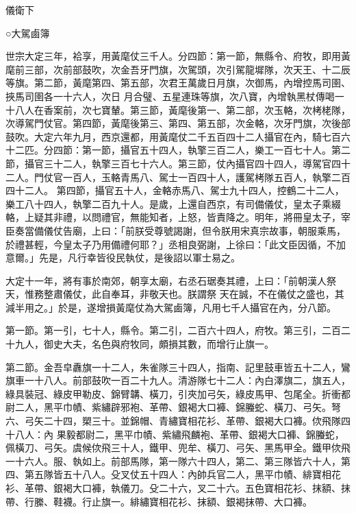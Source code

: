 
\begin{pinyinscope}

 儀衛下



 ○大駕鹵簿



 世宗大定三年，袷享，用黃麾仗三千人。分四節：第一節，無縣令、府牧，即用黃麾前三部，次前部鼓吹，次金吾牙門旗，次駕頭，次引駕龍墀隊，次天王、十二辰等旗。第二節，黃麾第四、第五部，次君王萬歲日月旗，次御馬，內增控馬司圉、挾馬司圉各一十六人，次日
 月合璧、五星連珠等旗，次八寶，內增執黑杖傳喝一十八人在香案前，次七寶輦。第三節，黃麾後第一、第二部，次玉輅，次栲栳隊，次導駕門仗官。第四節，黃麾後第三、第四、第五部，次金輅，次牙門旗，次後部鼓吹。大定六年九月，西京還都，用黃麾仗二千五百四十二人攝官在內，騎七百六十二匹。分四節：第一節，攝官五十四人，執擎三百二人，樂工一百七十人。第二節，攝官三十二人，執擎三百七十六人。第三節，仗內攝官四十四人，導駕官四十二人。門仗官一百人，玉輅青馬八、駕士一百四十人，護駕栲隊五百人，執擎二百四十二人。
 第四節，攝官五十人，金輅赤馬八、駕士九十四人，控鶴二十二人，樂工八十四人，執擎二百九十人。是歲，上還自西京，有司備儀仗，皇太子乘綴輅，上疑其非禮，以問禮官，無能知者，上怒，皆責降之。明年，將冊皇太子，宰臣奏當備儀仗告廟，上曰：「前朕受尊號謁謝，但令朕用宋真宗故事，朝服乘馬，於禮甚輕，今皇太子乃用備禮何耶？」丞相良弼謝，上徐曰：「此文臣因循，不加意爾。」先是，凡行幸皆役民執仗，是後詔以軍士易之。



 大定十一年，將有事於南郊，朝享太廟，右丞石琚奏其禮，上曰：「前朝漢人祭天，惟務整肅儀仗，此自奉耳，非敬天也。朕謂祭
 天在誠，不在儀仗之盛也，其減半用之。」於是，遂增損黃麾仗為大駕鹵簿，凡用七千人攝官在內，分八節。



 第一節。第一引，七十人，縣令。第二引，二百六十四人，府牧。第三引，二百二十九人，御史大夫，名色與府牧同，頗損其數，而增行止旗一。



 第二節。金吾皁纛旗一十二人，朱雀隊三十四人，指南、記里鼓車皆五十二人，鸞旗車一十八人。前部鼓吹一百二十九人。清游隊七十二人：內白澤旗二，旗五人，綠具裝冠、綠皮甲勒皮、錦臂韝、橫刀，引夾加弓矢，綠皮馬甲、包尾全。折衝都尉二人，黑平巾幘、紫繡辟邪袍、革帶、銀褐大口褲、錦螣蛇、橫刀、弓矢。弩六、弓矢二十四，槊三十。並錦帽、青繡寶相花衫、革帶、銀褐大口褲。佽飛隊四十八人：內
 果毅都尉二，黑平巾幘、紫繡飛麟袍、革帶、銀褐大口褲、錦螣蛇，佩橫刀、弓矢。虞候佽飛三十人，鐵甲、兜牟、橫刀、弓矢、黑馬甲全。鐵甲佽飛一十六人。服、執如上。前部馬隊，第一隊六十四人，第二、第三隊皆六十人，第四、第五隊皆五十八人。殳叉仗五十四人：內帥兵官二人，黑平巾幘、緋寶相花衫、革帶、銀褐大口褲，執儀刀。殳二十六，叉二十六。五色寶相花衫、抹額、抹帶、行縢、鞋襪。行止旗一。緋繡寶相花衫、抹額、銀褐抹帶、大口褲。




\end{pinyinscope}
